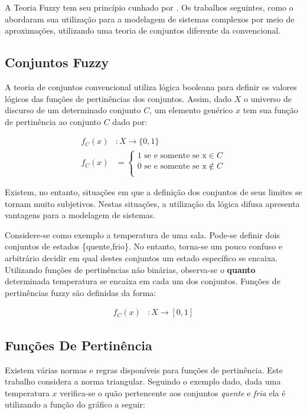 \indent A Teoria Fuzzy tem seu princípio cunhado por \cite{zadeh65}. Os trabalhos seguintes, como o \cite{takagi_sugeno} abordaram sua utilização para a modelagem de sistemas complexos por meio de aproximações, utilizando uma teoria de conjuntos diferente da convencional.

\subsection{Conjuntos Fuzzy}
\indent A teoria de conjuntos convencional utiliza lógica booleana para definir os valores lógicos das funções de pertinências dos conjuntos. Assim, dado $X$ o universo de discurso de um determinado conjunto $C$, um elemento genérico $x$ tem sua função de pertinência ao conjunto $C$ dado por:

\begin{align*}
f_{C}(x)&:X \rightarrow \{0,1\} \quad \\
f_{C}(x)&= 
\begin{cases}
1 \text{ se e somente se x} \in C \\
0 \text{ se e somente se x} \notin C\\
\end{cases}
\end{align*}

Existem, no entanto, situações em que a definição dos conjuntos de seus limites se tornam muito subjetivos. Nestas situações, a utilização da lógica difusa apresenta vantagens para a modelagem de sistemas. 

Considere-se como exemplo a temperatura de uma sala. Pode-se definir dois conjuntos de estados \{quente,frio\}. No entanto, torna-se um pouco confuso e arbitrário decidir em qual destes conjuntos um estado específico se encaixa. Utilizando funções de pertinências não binárias, observa-se o \textbf{quanto} determinada temperatura se encaixa em cada um dos conjuntos. Funções de pertinências fuzzy são definidas da forma:

\begin{align*}
f_{C}(x)&:X \rightarrow [0,1]
\end{align*}

\subsection{Funções De Pertinência}
Existem várias normas e regras disponíveis para funções de pertinência. Este trabalho considera a norma triangular. Seguindo o exemplo dado, dada uma temperatura $x$ verifica-se o quão pertencente aos conjuntos \textit{quente} e \textit{fria} ela é utilizando a função do gráfico a seguir:

